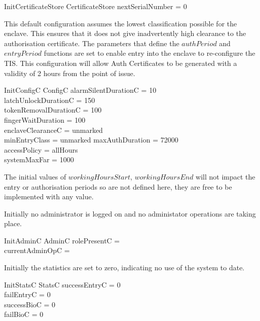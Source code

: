 \begin{schema}{InitCertificateStore}
        CertificateStore
\where
        nextSerialNumber = 0
\end{schema}        


This default configuration assumes the lowest classification possible
for the enclave. This ensures that it does not give inadvertently
high clearance to the authorisation certificate. The parameters that
define the $authPeriod$
and $entryPeriod$ functions are set to enable entry into the enclave
to re-configure the TIS. This configuration will
allow Auth Certificates to be generated with a validity of 2 hours
from the point of issue.
\begin{schema}{InitConfigC}
        ConfigC
\where
	alarmSilentDurationC = 10
\\      latchUnlockDurationC = 150
\\      tokenRemovalDurationC = 100
\\      fingerWaitDuration = 100
\\      enclaveClearanceC = unmarked
\\      minEntryClass = unmarked
\also   
        maxAuthDuration = 72000
\\      accessPolicy = allHours
\\      systemMaxFar = 1000
\end{schema}
\begin{Zcomment}
\item 
The initial values of $workingHoursStart$, $workingHoursEnd$ will not
impact the entry or authorisation periods so are not defined here,
they are free to be implemented with any value.
\end{Zcomment} 

Initially no administrator is logged on and no administator operations
are taking place.
\begin{schema}{InitAdminC}
        AdminC
\where
        rolePresentC = \Nil
\\      currentAdminOpC = \Nil
\end{schema}

Initially the statistics are set to zero, indicating no use of the
system to date.
\begin{schema}{InitStatsC}
        StatsC
\where
        successEntryC = 0
\\      failEntryC = 0
\\      successBioC = 0
\\      failBioC = 0
\end{schema}        


